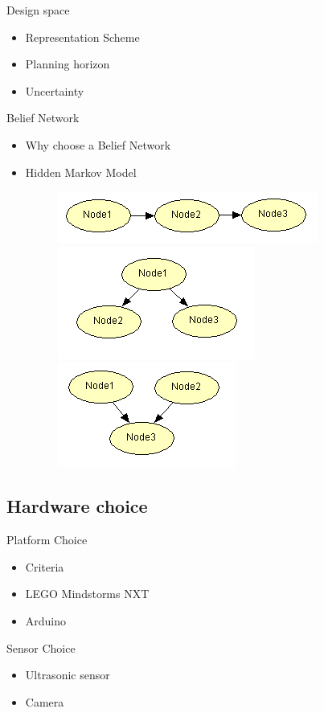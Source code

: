 \begin{frame}{Design space}
\begin{itemize}
\item Representation Scheme
\item Planning horizon
\item Uncertainty
\end{itemize}
\end{frame}

\begin{frame}{Belief Network}
\begin{itemize}
 \item Why choose a Belief Network
 \item Hidden Markov Model
 \begin{figure}
  \includegraphics[scale=0.4]{figures/Serial2.PNG}
  \includegraphics[scale=0.4]{figures/Divergent2.PNG}
  \includegraphics[scale=0.4]{figures/Convergent2.PNG}
\end{figure}
\end{itemize}
\end{frame}

\subsection{Hardware choice}
\begin{frame}{Platform Choice}
\begin{itemize}
 \item Criteria
 \item LEGO Mindstorms NXT
 \item Arduino
\end{itemize}
\end{frame}

\begin{frame}{Sensor Choice}
\begin{itemize}
 \item Ultrasonic sensor
 \item Camera
\end{itemize}
\end{frame}
 
